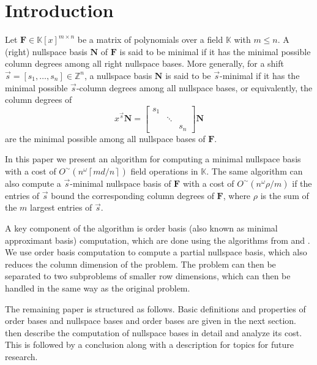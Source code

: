 
\section{Introduction}

Let $\mathbf{F}\in\mathbb{K}\left[x\right]^{m\times n}$ be a matrix
of polynomials over a field $\mathbb{K}$ with $m\le n$. A (right)
nullspace basis $\mathbf{N}$ of $\mathbf{F}$ is said to be minimal
if it has the minimal possible column degrees among all right nullspace
bases. More generally, for a shift $\vec{s}=[s_{1},\dots,s_{n}]\in\mathbb{Z}^{n}$,
a nullspace basis $\mathbf{N}$ is said to be $\vec{s}$-minimal if
it has the minimal possible $\vec{s}$-column degrees among all nullspace
bases, or equivalently, the column degrees of 
\[
x^{\vec{s}}\mathbf{N}=\begin{bmatrix}s_{1}\\
 & \ddots\\
 &  & s_{n}
\end{bmatrix}\mathbf{N}
\]
 are the minimal possible among all nullspace bases of $\mathbf{F}$.

In this paper we present an algorithm for computing a minimal nullspace
basis with a cost of $O^{\sim}\left(n^{\omega}\left\lceil md/n\right\rceil \right)$
field operations in $\mathbb{K}$. The same algorithm can also compute
a $\vec{s}$-minimal nullspace basis of $\mathbf{F}$ with a cost
of $O^{\sim}(n^{\omega}\rho/m)$ if the entries of $\vec{s}$ bound
the corresponding column degrees of $\mathbf{F}$, where $\rho$ is
the sum of the $m$ largest entries of $\vec{s}$.

\begin{comment}
A key ingredient of this algorithm is another algorithm, also presented
in this paper, for computing a $\vec{s}$-minimal shifted nullspace
basis of an input matrix with row dimension $m$ and column dimension
$n$ satisfy $n\in\Theta(m)$, where the entries of the shift $\vec{s}$
bound the column degrees of $\mathbf{F}$ component-wise, that is,
each entry $s_{i}$ is greater than or equal to the degree of the
$i$-th column of $\mathbf{F}$. For example, the shift $\vec{s}$
can be simply the column degrees of $\mathbf{F}$. If $\xi$ is the
sum of the entries of $\vec{s}$, a $\vec{s}$-minimal nullspace basis
can be computed with a cost of $O^{\sim}(n^{\omega-1}\xi)$ field
operations.
\end{comment}


A key component of the algorithm is order basis (also known as minimal
approximant basis) computation, which are done using the algorithms
from \citet{Giorgi2003} and \citet{za2009}. We use order basis computation
to compute a partial nullspace basis, which also reduces the column
dimension of the problem. The problem can then be separated to two
subproblems of smaller row dimensions, which can then be handled in
the same way as the original problem. 

The remaining paper is structured as follows. Basic definitions and
properties of order bases and nullspace bases and order bases are
given in the next section. 
then describe the computation of nullspace bases in detail and analyze
its cost. This is followed by a conclusion along with a description
for topics for future research. 

